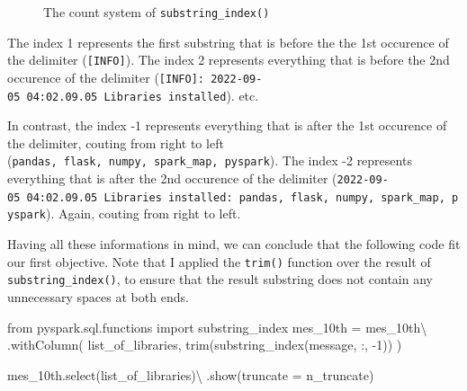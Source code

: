 \documentclass[
  11pt,
  letterpaper,
  DIV=11,
  numbers=noendperiod]{scrreprt}
\newenvironment{Shaded}{\begin{snugshade}}{\end{snugshade}}
\newcommand{\DecValTok}[1]{\textcolor[rgb]{0.68,0.00,0.00}{#1}}
\newcommand{\ImportTok}[1]{\textcolor[rgb]{0.00,0.46,0.62}{#1}}
\newcommand{\NormalTok}[1]{\textcolor[rgb]{0.00,0.23,0.31}{#1}}
\newcommand{\OperatorTok}[1]{\textcolor[rgb]{0.37,0.37,0.37}{#1}}
\newcommand{\StringTok}[1]{\textcolor[rgb]{0.13,0.47,0.30}{#1}}
\begin{document}
\begin{figure}


\caption{\label{fig-substring-delimiter2}The count system of
\texttt{substring\_index()}}

\end{figure}%

The index 1 represents the first substring that is before the the 1st
occurence of the delimiter (\texttt{{[}INFO{]}}). The index 2 represents
everything that is before the 2nd occurence of the delimiter
(\texttt{{[}INFO{]}:\ 2022-09-05\ 04:02.09.05\ Libraries\ installed}).
etc.

In contrast, the index -1 represents everything that is after the 1st
occurence of the delimiter, couting from right to left
(\texttt{pandas,\ flask,\ numpy,\ spark\_map,\ pyspark}). The index -2
represents everything that is after the 2nd occurence of the delimiter
(\texttt{2022-09-05\ 04:02.09.05\ Libraries\ installed:\ pandas,\ flask,\ numpy,\ spark\_map,\ pyspark}).
Again, couting from right to left.

Having all these informations in mind, we can conclude that the
following code fit our first objective. Note that I applied the
\texttt{trim()} function over the result of \texttt{substring\_index()},
to ensure that the result substring does not contain any unnecessary
spaces at both ends.

\begin{Shaded}
\begin{Highlighting}[]
\ImportTok{from}\NormalTok{ pyspark.sql.functions }\ImportTok{import}\NormalTok{ substring\_index}
\NormalTok{mes\_10th }\OperatorTok{=}\NormalTok{ mes\_10th}\OperatorTok{\textbackslash{}}
\NormalTok{    .withColumn(}
        \StringTok{\textquotesingle{}list\_of\_libraries\textquotesingle{}}\NormalTok{,}
\NormalTok{        trim(substring\_index(}\StringTok{\textquotesingle{}message\textquotesingle{}}\NormalTok{, }\StringTok{\textquotesingle{}:\textquotesingle{}}\NormalTok{, }\OperatorTok{{-}}\DecValTok{1}\NormalTok{))}
\NormalTok{    )}

\NormalTok{mes\_10th.select(}\StringTok{\textquotesingle{}list\_of\_libraries\textquotesingle{}}\NormalTok{)}\OperatorTok{\textbackslash{}}
\NormalTok{    .show(truncate }\OperatorTok{=}\NormalTok{ n\_truncate)}
\end{Highlighting}
\end{Shaded}
\end{document}
